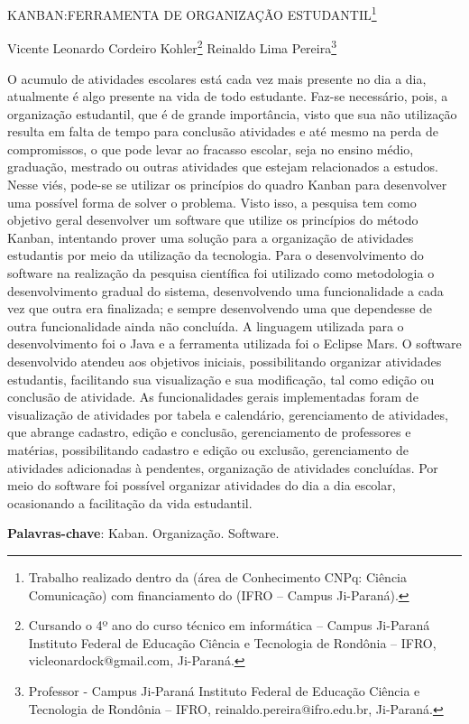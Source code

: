 \documentclass[article,12pt,onesidea,4paper,english,brazil]{abntex2}
\begin{document}
	
	
	\frenchspacing 
	
	\begin{center}
		\LARGE KANBAN:FERRAMENTA DE ORGANIZAÇÃO ESTUDANTIL\footnote{Trabalho realizado dentro da (área de Conhecimento CNPq: Ciência Comunicação) com financiamento do (IFRO – Campus Ji-Paraná).}
		
		\normalsize
	Vicente Leonardo Cordeiro Kohler\footnote{Cursando o 4º ano do curso técnico em informática – Campus Ji-Paraná Instituto Federal de
		Educação Ciência e Tecnologia de Rondônia – IFRO, vicleonardock@gmail.com, Ji-Paraná.} 
	Reinaldo Lima Pereira\footnote{Professor - Campus Ji-Paraná Instituto Federal de Educação Ciência e Tecnologia de Rondônia –
		IFRO, reinaldo.pereira@ifro.edu.br, Ji-Paraná.} 
	\end{center}
	
	\noindent O acumulo de atividades escolares está cada vez mais presente no dia a dia,
	atualmente é algo presente na vida de todo estudante. Faz-se necessário, pois, a
	organização estudantil, que é de grande importância, visto que sua não utilização
	resulta em falta de tempo para conclusão atividades e até mesmo na perda de
	compromissos, o que pode levar ao fracasso escolar, seja no ensino médio,
	graduação, mestrado ou outras atividades que estejam relacionados a estudos.
	Nesse viés, pode-se se utilizar os princípios do quadro Kanban para desenvolver
	uma possível forma de solver o problema. Visto isso, a pesquisa tem como objetivo
	geral desenvolver um software que utilize os princípios do método Kanban,
	intentando prover uma solução para a organização de atividades estudantis por meio
	da utilização da tecnologia. Para o desenvolvimento do software na realização da
	pesquisa científica foi utilizado como metodologia o desenvolvimento gradual do
	sistema, desenvolvendo uma funcionalidade a cada vez que outra era finalizada; e
	sempre desenvolvendo uma que dependesse de outra funcionalidade ainda não
	concluída. A linguagem utilizada para o desenvolvimento foi o Java e a ferramenta
	utilizada foi o Eclipse Mars. O software desenvolvido atendeu aos objetivos iniciais,
	possibilitando organizar atividades estudantis, facilitando sua visualização e sua
	modificação, tal como edição ou conclusão de atividade. As funcionalidades gerais
	implementadas foram de visualização de atividades por tabela e calendário,
	gerenciamento de atividades, que abrange cadastro, edição e conclusão,
	gerenciamento de professores e matérias, possibilitando cadastro e edição ou
	exclusão, gerenciamento de atividades adicionadas à pendentes, organização de
	atividades concluídas. Por meio do software foi possível organizar atividades do dia
	a dia escolar, ocasionando a facilitação da vida estudantil.
	
	\vspace{\onelineskip}
	
	\noindent
	\textbf{Palavras-chave}: Kaban. Organização. Software.
	
\end{document}
